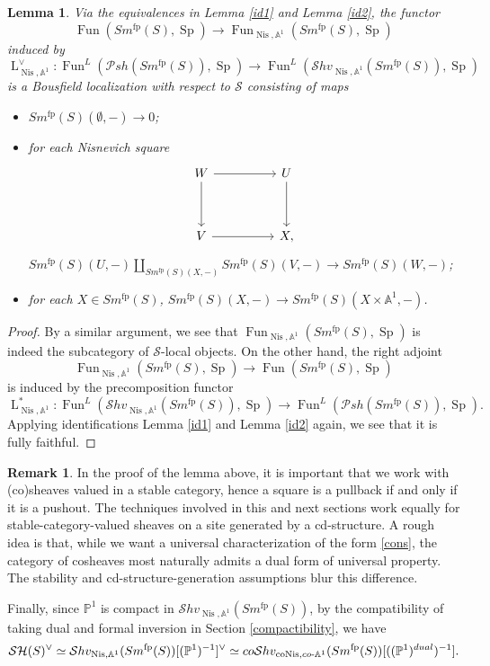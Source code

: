 \documentclass{article}
\newtheorem{lm}[thm]{Lemma}
\theoremstyle{definition}
\newtheorem{rmk}[thm]{Remark}
\newcommand{\on}{\operatorname}
\begin{document}
\begin{lm}\label{desc}
Via the equivalences in Lemma \ref{id1} and Lemma \ref{id2}, the functor\[
\on{Fun}(Sm^{\on{fp}}(S),\on{Sp})\rightarrow\on{Fun}_{\on{Nis},\mathbb{A}^1}(Sm^{\on{fp}}(S),\on{Sp})\]
induced by\[
\on{L}_{\on{Nis},\mathbb{A}^1}^\vee:\on{Fun}^L(\mathcal{P}sh(Sm^{\on{fp}}(S)),\on{Sp})\rightarrow\on{Fun}^L(\mathcal{S}hv_{\on{Nis},\mathbb{A}^1}(Sm^{\on{fp}}(S)),\on{Sp})\]
is a Bousfield localization with respect to $\mathcal{S}$ consisting of maps
\begin{itemize}
\item $Sm^{\on{fp}}(S)(\emptyset,-)\rightarrow0$;
\item for each Nisnevich square\[\begin{tikzcd}
	W && U \\
	\\
	V && X
	\arrow[from=1-1, to=1-3]
	\arrow[from=1-1, to=3-1]
	\arrow[from=1-3, to=3-3]
	\arrow[from=3-1, to=3-3],
\end{tikzcd}\]
$Sm^{\on{fp}}(S)(U,-)\amalg_{Sm^{\on{fp}}(S)(X,-)}Sm^{\on{fp}}(S)(V,-)\rightarrow Sm^{\on{fp}}(S)(W,-)$;
\item for each $X\in Sm^{\on{fp}}(S)$, $Sm^{\on{fp}}(S)(X,-)\rightarrow Sm^{\on{fp}}(S)(X\times\mathbb{A}^1,-)$.
\end{itemize}
\end{lm}
\begin{proof}
By a similar argument, we see that $\on{Fun}_{\on{Nis},\mathbb{A}^1}(Sm^{\on{fp}}(S),\on{Sp})$ is indeed the subcategory of $\mathcal{S}$-local objects. On the other hand, the right adjoint\[
\on{Fun}_{\on{Nis},\mathbb{A}^1}(Sm^{\on{fp}}(S),\on{Sp})\rightarrow\on{Fun}(Sm^{\on{fp}}(S),\on{Sp})\]
is induced by the precomposition functor\[
\on{L}_{\on{Nis},\mathbb{A}^1}^\ast:\on{Fun}^L(\mathcal{S}hv_{\on{Nis},\mathbb{A}^1}(Sm^{\on{fp}}(S)),\on{Sp})\rightarrow\on{Fun}^L(\mathcal{P}sh(Sm^{\on{fp}}(S)),\on{Sp}).\]
Applying identifications Lemma \ref{id1} and Lemma \ref{id2} again, we see that it is fully faithful.
\end{proof}
\begin{rmk}
In the proof of the lemma above, it is important that we work with (co)sheaves valued in a stable category, hence a square is a pullback if and only if it is a pushout. The techniques involved in this and next sections work equally for stable-category-valued sheaves on a site generated by a cd-structure. A rough idea is that, while we want a universal characterization of the form \ref{cons}, the category of cosheaves most naturally admits a dual form of universal property. The stability and cd-structure-generation assumptions blur this difference.
\end{rmk}
Finally, since $\mathbb{P}^1$ is compact in $\mathcal{S}hv_{\on{Nis},\mathbb{A}^1}(Sm^{\on{fp}}(S))$, by the compatibility of taking dual and formal inversion in Section \ref{compactibility}, we have\[
\mathcal{SH}(S)^{\vee}\simeq\mathcal{S}hv_{\on{Nis},\mathbb{A}^1}(Sm^{\on{fp}}(S))[(\mathbb{P}^1)^{-1}]^{\vee}\simeq co\mathcal{S}hv_{\on{coNis},co{\text -}\mathbb{A}^1}(Sm^{\on{fp}}(S))[((\mathbb{P}^1)^{dual})^{-1}].\]
\end{document}

